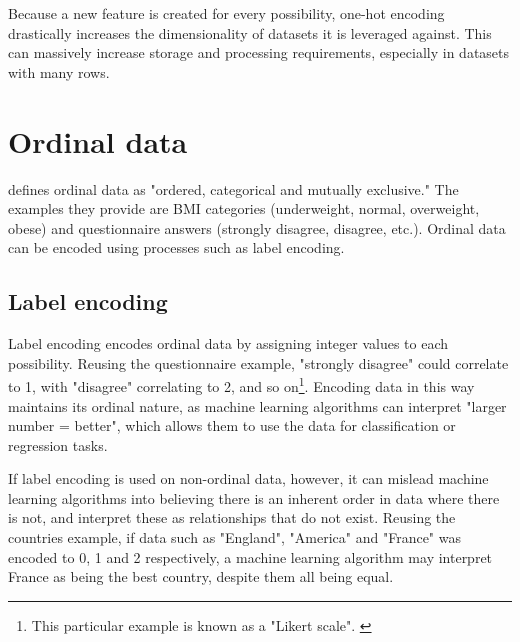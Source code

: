 \para Because a new feature is created for every possibility, one-hot encoding drastically increases the dimensionality of 
datasets it is leveraged against. This can massively increase storage and processing requirements, especially in datasets 
with many rows.

\section{Ordinal data}
\textcite{oxford_brookes_university_types_nodate} defines ordinal data as "ordered, categorical and mutually exclusive."
The examples they provide are BMI categories (underweight, normal, overweight, obese) and questionnaire answers (strongly disagree,
disagree, etc.). Ordinal data can be encoded using processes such as label encoding.

\subsection{Label encoding}
Label encoding encodes ordinal data by assigning integer values to each possibility. Reusing the questionnaire example, "strongly disagree"
could correlate to 1, with "disagree" correlating to 2, and so on\footnote{This particular example is known as a "Likert scale". \autocite{oxford_brookes_university_types_nodate}}. 
Encoding data in this way maintains its ordinal nature, as machine learning algorithms can interpret "larger number = better", which allows them
to use the data for classification or regression tasks. 

\para If label encoding is used on non-ordinal data, however, it can mislead machine learning algorithms into believing there is an inherent 
order in data where there is not, and interpret these as relationships that do not exist. Reusing the countries example, if data such 
as "England", "America" and "France" was encoded to 0, 1 and 2 respectively, a machine learning algorithm may interpret France as being the 
best country, despite them all being equal. 